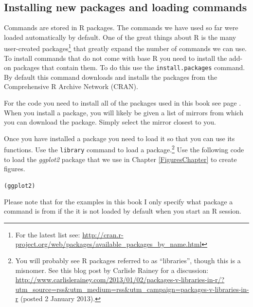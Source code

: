 \documentclass[krantz1]{krantz}
\begin{document}
\subsection{Installing new packages and loading commands}\label{Packages}

Commands are stored in R packages. The commands we have used so far were loaded automatically by default. One of the great things about R is the many user-created packages\footnote{For the latest list see: \url{http://cran.r-project.org/web/packages/available_packages_by_name.html}} that greatly expand the number of commands we can use. To install commands that do not come with base R you need to install the add-on packages\label{packages} that contain them. To do this use the {\tt{install.packages}} command. By default this command downloads and installs the packages from the Comprehensive R Archive Network (CRAN). 

For the code you need to install all of the packages used in this book see page \pageref{ReqPackages}. When you install a package, you will likely be given a list of mirrors from which you can download the package. Simply select the mirror closest to you.

Once you have installed a package you need to load it so that you can use its functions. Use the \texttt{library} command to load a package.\footnote{You will probably see R packages referred to as ``libraries'', though this is a misnomer. See this blog post by Carlisle Rainey for a discussion: \url{http://www.carlislerainey.com/2013/01/02/packages-v-libraries-in-r/?utm_source=rss&utm_medium=rss&utm_campaign=packages-v-libraries-in-r} (posted 2 January 2013).} Use the following code to load the {\emph{ggplot2}} package that we use in Chapter \ref{FiguresChapter} to create figures.

\begin{knitrout}
\color{fgcolor}\begin{kframe}
\begin{alltt}
(ggplot2)
\end{alltt}
\end{kframe}
\end{knitrout}


\noindent Please note that for the examples in this book I only specify what package a command is from if the it is not loaded by default when you start an R session. 
\end{document}
